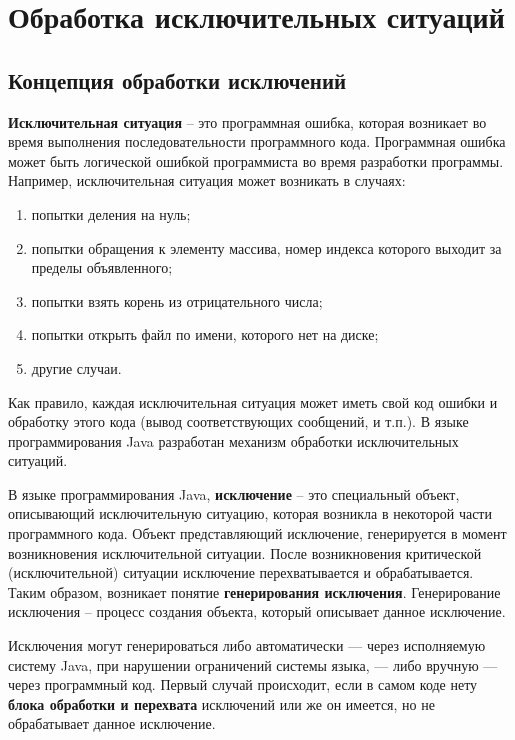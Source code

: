 \documentclass{report}
\begin{document}
\newpage
\chapter{Обработка исключительных ситуаций}

\section{Концепция обработки исключений}

\textbf{Исключительная ситуация} – это программная ошибка, которая возникает во время выполнения последовательности программного кода. Программная ошибка может быть логической ошибкой программиста во время разработки программы. Например, исключительная ситуация может возникать в случаях:

\begin{enumerate}
    \item попытки деления на нуль;
    \item попытки обращения к элементу массива, номер индекса которого выходит за пределы объявленного;
    \item попытки взять корень из отрицательного числа;
    \item попытки открыть файл по имени, которого нет на диске;
    \item другие случаи.
\end{enumerate}

Как правило, каждая исключительная ситуация может иметь свой код ошибки и обработку этого кода (вывод соответствующих сообщений, и т.п.). В языке программирования Java разработан механизм обработки исключительных ситуаций.

В языке программирования Java, \textbf{исключение} – это специальный объект, описывающий исключительную ситуацию, которая возникла в некоторой части программного кода. Объект представляющий исключение, генерируется в момент возникновения исключительной ситуации. После возникновения критической (исключительной) ситуации исключение перехватывается и обрабатывается. Таким образом, возникает понятие \textbf{ генерирования исключения}. Генерирование исключения – процесс создания объекта, который описывает данное исключение.

Исключения могут генерироваться либо автоматически — через исполняемую систему Java, при нарушении ограничений системы языка, — либо вручную — через программный код. Первый случай происходит, если в самом коде нету \textbf{блока обработки и перехвата} исключений или же он имеется, но не обрабатывает данное исключение.
\end{document}

